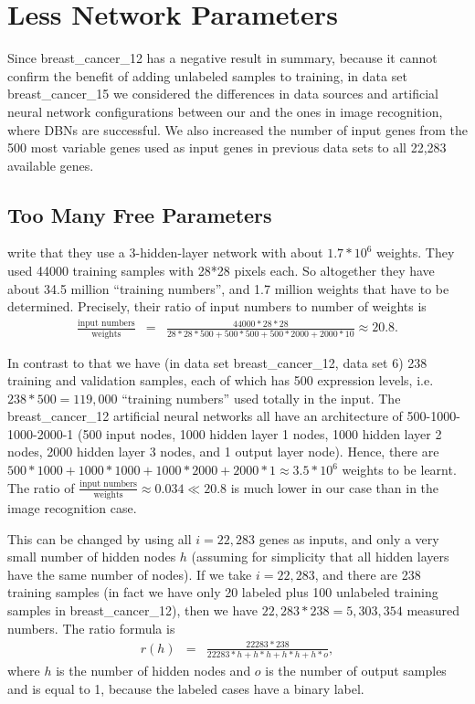 \section{Less Network Parameters\label{sec:breast_cancer_15}}

Since breast\_cancer\_12 has a negative result in summary, because
it cannot confirm the benefit of adding unlabeled samples to training,
in data set breast\_cancer\_15
we considered the differences in data sources and artificial neural
network configurations between our and the ones in image recognition,
where DBNs are successful. We also increased the number of input genes
from the 500 most variable genes used as input genes in previous data
sets to all 22,283 available genes.

\subsection{Too Many Free Parameters}

\cite{HintonTeh2006} write that they use a 3-hidden-layer network
with about $1.7*10^{6}$ weights. They used 44000 training samples
with 28{*}28 pixels each. So altogether they have about 34.5 million
``training numbers'', and 1.7 million weights that have to be determined.
Precisely, their ratio of input numbers to number of weights is 
\begin{eqnarray*}
\frac{\mbox{input numbers}}{\mbox{weights}} & = & \frac{44000*28*28}{28*28*500+500*500+500*2000+2000*10}\approx20.8.
\end{eqnarray*}

In contrast to that we have (in data set breast\_cancer\_12, data
set 6) 238 training and validation samples, each of which has 500
expression levels, i.e. $238*500=119,000$ ``training numbers''
used totally in the input. The breast\_cancer\_12 artificial neural
networks all have an architecture of 500-1000-1000-2000-1 (500 input
nodes, 1000 hidden layer 1 nodes, 1000 hidden layer 2 nodes, 2000
hidden layer 3 nodes, and 1 output layer node). Hence, there are $500*1000+1000*1000+1000*2000+2000*1\approx3.5*10^{6}$
weights to be learnt. The ratio of $\frac{\mbox{input numbers}}{\mbox{weights}}\approx0.034\ll20.8$
is much lower in our case than in the image recognition case. 

This can be changed by using all $i=22,283$ genes as inputs, and
only a very small number of hidden nodes $h$ (assuming for simplicity
that all hidden layers have the same number of nodes). If we take
$i=22,283$, and there are 238 training samples (in fact we have only
20 labeled plus 100 unlabeled training samples in breast\_cancer\_12),
then we have $22,283*238=5,303,354$ measured numbers. The ratio formula
is
\begin{eqnarray*}
r(h) & = & \frac{22283*238}{22283*h+h*h+h*h+h*o},
\end{eqnarray*}
where $h$ is the number of hidden nodes and $o$ is the number of
output samples and is equal to 1, because the labeled cases have a
binary label.


